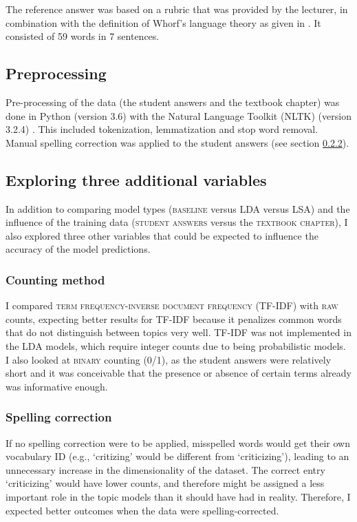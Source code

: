\documentclass[a4paper,10pt,twoside]{article}
\begin{document}
The reference answer was based on a rubric that was provided by the lecturer, in combination with the definition of Whorf's language theory as given in . It consisted of 59 words in 7 sentences.

\subsection{Preprocessing}
Pre-processing of the data (the student answers and the textbook chapter) was done in Python (version 3.6) with the Natural Language Toolkit (NLTK) (version 3.2.4) \cite{bird2009}. This included tokenization, lemmatization and stop word removal. Manual spelling correction was applied to the student answers (see section \ref{sec:spelling}).

\subsection{Exploring three additional variables}
\label{sec:exploring}
In addition to comparing model types (\textsc{baseline} versus LDA versus LSA) and the influence of the training data (\textsc{student answers} versus the \textsc{textbook chapter}), I also explored three other variables that could be expected to influence the accuracy of the model predictions.

\subsubsection{Counting method}
\label{sec:countingmethod}
I compared \textsc{term frequency-inverse document frequency} (TF-IDF) with \textsc{raw} counts, expecting better results for TF-IDF because it penalizes common words that do not distinguish between topics very well. TF-IDF was not implemented in the LDA models, which require integer counts due to being probabilistic models. I also looked at \textsc{binary} counting (0/1), as the student answers were relatively short and it was conceivable that the presence or absence of certain terms already was informative enough.

\subsubsection{Spelling correction}
\label{sec:spelling}
If no spelling correction were to be applied, misspelled words would get their own vocabulary ID (e.g., `critizing' would be different from `criticizing'), leading to an unnecessary increase in the dimensionality of the dataset. The correct entry `criticizing' would have lower counts, and therefore might be assigned a less important role in the topic models than it should have had in reality. Therefore, I expected better outcomes when the data were spelling-corrected.
\end{document}
